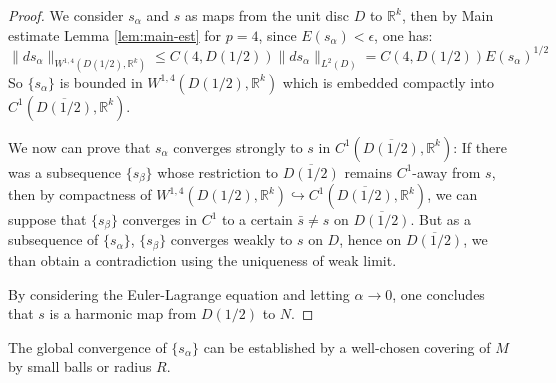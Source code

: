 \begin{proof}
We consider \(s_\alpha\) and \(s\) as maps from the unit disc \(D\) to \(\mathbb{R}^k\), then by Main estimate Lemma \ref{lem:main-est} for \(p=4\), since \(E(s_\alpha) < \epsilon\), one has:
\[
\|ds_\alpha\|_{W^{1,4}(D(1/2), \mathbb{R}^k)} \leq C(4, D(1/2)) \| ds_\alpha\|_{L^2(D)} =
C(4, D(1/2)) E(s_\alpha)^{1/2}
\]
So \(\{s_\alpha\}\) is bounded in \(W^{1,4}(D(1/2), \mathbb{R}^k)\) which is embedded
compactly into \(C^1(\overline{D(1/2)}, \mathbb{R}^k)\).

We now can prove that \(s_\alpha\) converges strongly to \(s\) in \(C^1(\overline{D(1/2)},\mathbb{R}^k)\): If there was a subsequence \(\{s_\beta\}\)
whose restriction to \(\overline{D(1/2)}\) remains \(C^1\)-away from \(s\), then by compactness of \(W^{1,4}(D(1/2),
\mathbb{R}^k) \hookrightarrow C^1(\overline{D(1/2)}, \mathbb{R}^k)\), we can suppose that \(\{s_\beta\}\) converges in \(C^1\) to a certain \(\bar s\ne s\) on \(\overline{D(1/2)}\). But as a
subsequence of \(\{s_\alpha\}\), \(\{s_\beta\}\) converges weakly to \(s\) on \(D\), hence on \(\overline{D(1/2)}\), we than obtain a contradiction using the uniqueness of
weak limit.

By considering the Euler-Lagrange equation and letting \(\alpha\to 0\), one concludes
that \(s\) is a harmonic map from \(D(1/2)\) to \(N\).
\end{proof}

The global convergence of \(\{s_\alpha\}\) can be established by a well-chosen covering
of \(M\) by small balls or radius \(R\).

